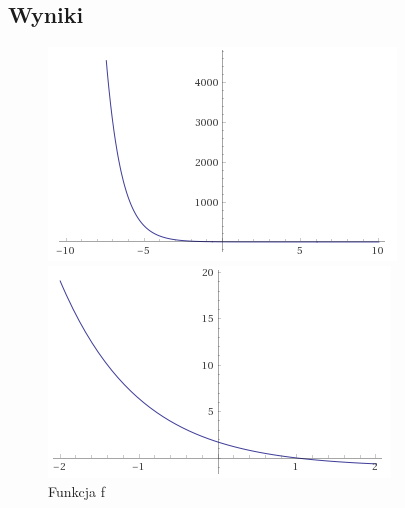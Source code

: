\documentclass[11pt, a4paper]{article}
\begin{document}
    \subsection{Wyniki}
    \begin{figure}[H]
        \caption{Funkcja f}
        \begin{minipage}{0.4\textwidth}
            \centering
            \includegraphics[width=\linewidth]{fminus10to10}
        \end{minipage}
        \begin{minipage}{0.4\textwidth}
            \centering
            \includegraphics[width=\linewidth]{fminus2to2}
        \end{minipage}
    \end{figure}
\end{document}
